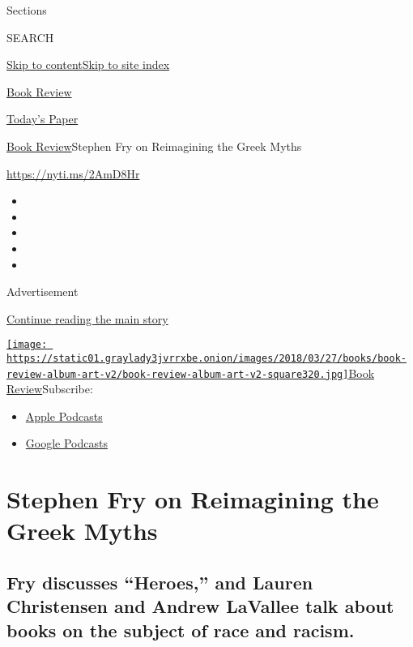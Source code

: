 Sections

SEARCH

\protect\hyperlink{site-content}{Skip to
content}\protect\hyperlink{site-index}{Skip to site index}

\href{https://www.nytimes3xbfgragh.onion/section/books/review}{Book
Review}

\href{https://myaccount.nytimes3xbfgragh.onion/auth/login?response_type=cookie\&client_id=vi}{}

\href{https://www.nytimes3xbfgragh.onion/section/todayspaper}{Today's
Paper}

\href{/section/books/review}{Book Review}\textbar{}Stephen Fry on
Reimagining the Greek Myths

\url{https://nyti.ms/2AmD8Hr}

\begin{itemize}
\item
\item
\item
\item
\item
\end{itemize}

Advertisement

\protect\hyperlink{after-top}{Continue reading the main story}

\href{https://www.nytimes3xbfgragh.onion/column/book-review-podcast}{\texttt{[image: https://static01.graylady3jvrrxbe.onion/images/2018/03/27/books/book-review-album-art-v2/book-review-album-art-v2-square320.jpg]}Book
Review}Subscribe:

\begin{itemize}
\tightlist
\item
  \href{https://itunes.apple.com/us/podcast/id120315179}{Apple Podcasts}
\item
  \href{https://www.google.com/podcasts?feed=aHR0cHM6Ly9yc3MuYXJ0MTkuY29tL2Jvb2stcmV2aWV3}{Google
  Podcasts}
\end{itemize}

\hypertarget{stephen-fry-on-reimagining-the-greek-myths}{%
\section{Stephen Fry on Reimagining the Greek
Myths}\label{stephen-fry-on-reimagining-the-greek-myths}}

\hypertarget{fry-discusses-heroes-and-lauren-christensen-and-andrew-lavallee-talk-about-books-on-the-subject-of-race-and-racism}{%
\subsection{Fry discusses ``Heroes,'' and Lauren Christensen and Andrew
LaVallee talk about books on the subject of race and
racism.}\label{fry-discusses-heroes-and-lauren-christensen-and-andrew-lavallee-talk-about-books-on-the-subject-of-race-and-racism}}

